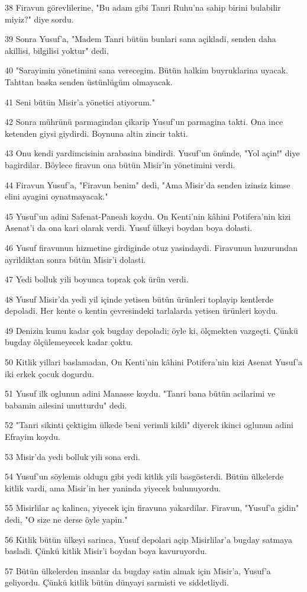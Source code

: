 \par 38 Firavun görevlilerine, "Bu adam gibi Tanri Ruhu'na sahip birini bulabilir miyiz?" diye sordu.
\par 39 Sonra Yusuf'a, "Madem Tanri bütün bunlari sana açikladi, senden daha akillisi, bilgilisi yoktur" dedi,
\par 40 "Sarayimin yönetimini sana verecegim. Bütün halkim buyruklarina uyacak. Tahttan baska senden üstünlügüm olmayacak.
\par 41 Seni bütün Misir'a yönetici atiyorum."
\par 42 Sonra mührünü parmagindan çikarip Yusuf'un parmagina takti. Ona ince ketenden giysi giydirdi. Boynuna altin zincir takti.
\par 43 Onu kendi yardimcisinin arabasina bindirdi. Yusuf'un önünde, "Yol açin!" diye bagirdilar. Böylece firavun ona bütün Misir'in yönetimini verdi.
\par 44 Firavun Yusuf'a, "Firavun benim" dedi, "Ama Misir'da senden izinsiz kimse elini ayagini oynatmayacak."
\par 45 Yusuf'un adini Safenat-Paneah koydu. On Kenti'nin kâhini Potifera'nin kizi Asenat'i da ona kari olarak verdi. Yusuf ülkeyi boydan boya dolasti.
\par 46 Yusuf firavunun hizmetine girdiginde otuz yasindaydi. Firavunun huzurundan ayrildiktan sonra bütün Misir'i dolasti.
\par 47 Yedi bolluk yili boyunca toprak çok ürün verdi.
\par 48 Yusuf Misir'da yedi yil içinde yetisen bütün ürünleri toplayip kentlerde depoladi. Her kente o kentin çevresindeki tarlalarda yetisen ürünleri koydu.
\par 49 Denizin kumu kadar çok bugday depoladi; öyle ki, ölçmekten vazgeçti. Çünkü bugday ölçülemeyecek kadar çoktu.
\par 50 Kitlik yillari baslamadan, On Kenti'nin kâhini Potifera'nin kizi Asenat Yusuf'a iki erkek çocuk dogurdu.
\par 51 Yusuf ilk oglunun adini Manasse koydu. "Tanri bana bütün acilarimi ve babamin ailesini unutturdu" dedi.
\par 52 "Tanri sikinti çektigim ülkede beni verimli kildi" diyerek ikinci oglunun adini Efrayim koydu.
\par 53 Misir'da yedi bolluk yili sona erdi.
\par 54 Yusuf'un söylemis oldugu gibi yedi kitlik yili basgösterdi. Bütün ülkelerde kitlik vardi, ama Misir'in her yaninda yiyecek bulunuyordu.
\par 55 Misirlilar aç kalinca, yiyecek için firavuna yakardilar. Firavun, "Yusuf'a gidin" dedi, "O size ne derse öyle yapin."
\par 56 Kitlik bütün ülkeyi sarinca, Yusuf depolari açip Misirlilar'a bugday satmaya basladi. Çünkü kitlik Misir'i boydan boya kavuruyordu.
\par 57 Bütün ülkelerden insanlar da bugday satin almak için Misir'a, Yusuf'a geliyordu. Çünkü kitlik bütün dünyayi sarmisti ve siddetliydi.

